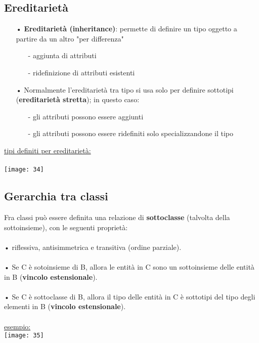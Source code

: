 \documentclass[12pt, letterpaper]{article}
\begin{document}
\subsection{Ereditarietà}

\begin{itemize}
   \item[•] \textbf{Ereditarietà (inheritance)}: permette di definire un tipo oggetto a partire da un altro "per differenza"
      \begin{itemize}
         \item[-] aggiunta di attributi 
         \item[-] ridefinizione di attributi esistenti
      \end{itemize}
   \item[•] Normalmente l'ereditarietà tra tipo si usa solo per definire sottotipi (\textbf{ereditarietà stretta}); in questo caso:
      \begin{itemize}
         \item[-] gli attributi possono essere aggiunti 
         \item[-] gli attributi possono essere ridefiniti solo specializzandone il tipo 
      \end{itemize}
\end{itemize}

\underline{tipi definiti per ereditarietà:}
\\
\\
\texttt{[image: 34]}

\subsection{Gerarchia tra classi}

Fra classi può essere definita una relazione di \textbf{sottoclasse} (talvolta della sottoinsieme), con le seguenti proprietà:\\
\\• riflessiva, antisimmetrica e transitiva (ordine parziale).\\
\\• Se C è sotoinsieme di B, allora le entità in C sono un sottoinsieme delle entità in B (\textbf{vincolo estensionale}).\\
\\• Se C è sottoclasse di B, allora il tipo delle entità in C è sottotipi del tipo degli elementi in B (\textbf{vincolo estensionale}).
\\
\\
\underline{esempio:}
\\
\texttt{[image: 35]}
\end{document}
